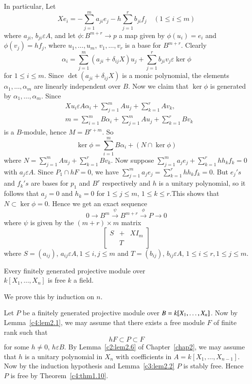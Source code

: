 \begin{Proof}
In particular, Let
$$
Xe_i=-\sum\limits_{j=1}^{m}a_{ji}e_j-h\sum\limits_{j=1}^{r}b_{ji}f_j\quad
(1\leq i\leq m)
$$
where $a_{ji}$, $b_{ji}\varepsilon A$, and let $\phi :
B^{m+r}\rightarrow p$ a map given by $\phi(u_i)=e_i$ and
$\phi(v_j)=hf_j$, where $u_1,\ldots,u_m$, $v_1,\ldots, v_r$ is a base
for $B^{m+r}$. Clearly
$$
\alpha_i=\sum\limits_{j=1}^{m}(a_{ji}+\delta_{ij}X)u_j+\sum\limits_{j=1}^{r}
b_{ji}v_j\varepsilon \ker \phi
$$
for $1\leq i\leq m$. Since $\det(a_{ji}+\delta_{ij}X)$ is a monic
polynomial, the elements $\alpha_1,\ldots,\alpha_m$ are linearly
independent over $B$. Now we claim that $\ker \phi$ is generated by
$\alpha_1,\ldots,\alpha_m$. Since 
$$
\begin{aligned}
&Xu_i\varepsilon
A\alpha_i+\sum\limits_{j=1}^{m}Au_j+\sum\limits_{k=1}^{r}Av_k,\\
&{} m=\sum\limits_{i=1}^{m} B\alpha_i+\sum\limits_{j=1}^{m}Au_j+\sum\limits_{k=1}^{r}Bv_k
\end{aligned}
$$
is a $B$-module, hence $M=B^{r+m}$. So 
$$
\ker \phi=\sum\limits_{i=1}^{m}B\alpha_i+(N\cap \ker \phi)
$$
where $N=\sum\limits_{j=1}^{m}Au_j+\sum\limits_{k=1}^{r}Bv_k$. Now
suppose $\sum\limits_{j=1}^{m}a_je_j+\sum\limits_{k=1}^{r}h h_kf_k=0$
with $a_j\varepsilon A$. Since $P_1\cap hF=0$, we have
$\sum\limits_{j=1}^{m}a_je_{j}=\sum\limits_{k=1}^{r} h h_kf_k=0$. But
$e_j's$ and $f_k's$ are bases for $p_1$ and $B^{r}$ respectively and
$h$ is a unitary polynomial, so it follows that $a_j=0$ and $h_k=0$
for $1\leq j\leq m$, $1\leq k\leq r$.This shows that $N\subset \ker
\phi=0$. Hence we get an exact sequence
$$
0\rightarrow B^{m}\xrightarrow{\psi}B^{m+r}\xrightarrow{\phi}
P\rightarrow 0
$$
where $\psi$ is given by the $(m+r)\times m$  matrix
$$
\begin{bmatrix}
S & + & XI_m\\
& T &
\end{bmatrix}
$$
where $S=(a_{ij})$, $a_{ij}\varepsilon A, 1\leq i,j\leq m$ and
$T=(b_{ij})$, $b_{ij}\varepsilon A$, $1\leq i\leq r, 1\leq j\leq m$.
\enprf
\end{Proof}


\begin{thm}\label{c4:thm2.3}
Every finitely generated projective module over\\ $k[X_1,\ldots,X_n]$ is
free $k$ a field.
\end{thm}

\begin{Proof}
We prove this by induction on $n$.

Let $P$ be a finitely generated projective module over
$B=\\k[X_1,\ldots,X_n]$. Now by Lemma~\ref{c4:lem2.1}, we may assume
that there exists a free module $F$ of finite rank such that 
$$
hF\subset P\subset F
$$
for some $h\neq 0$, $h\varepsilon B$. By Lemma~\ref{c2:lem2.6} of
Chapter~\ref{chap2}, we may assume that $h$ is a unitary polynomial in
$X_n$ with coefficients in $A=k[X_1,\ldots,X_{n-1}]$. Now by the
induction hypothesis and Lemma~\ref{c3:lem2.2} $P$ is stably
free. Hence $P$ is free by Theorem~\ref{c4:thm1.10}.
\enprf
\end{Proof}
